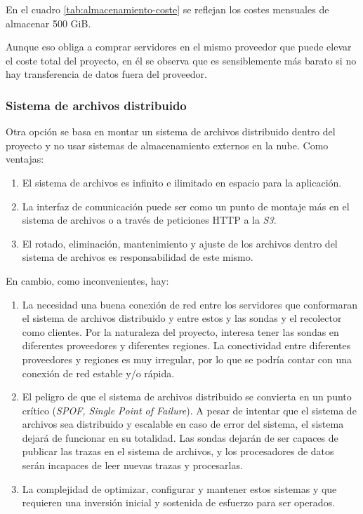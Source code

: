 En el cuadro \ref{tab:almacenamiento-coste} se reflejan los costes mensuales de almacenar 500 GiB. 

Aunque eso obliga a comprar servidores en el mismo proveedor que puede elevar el coste total del proyecto, en él se observa que es sensiblemente más barato si no hay transferencia de datos fuera del proveedor.

\subsubsection{Sistema de archivos distribuido}

Otra opción se basa en montar un sistema de archivos distribuido dentro del proyecto y no usar sistemas de almacenamiento externos
en la nube. Como ventajas:

\begin{enumerate}
    \item El sistema de archivos es infinito e ilimitado en espacio para la aplicación.
    \item La interfaz de comunicación puede ser como un punto de montaje más en el sistema de archivos o a través de 
    peticiones HTTP a la \emph{S3}.
    \item El rotado, eliminación, mantenimiento y ajuste de los archivos dentro del sistema de archivos es responsabilidad de este mismo.
\end{enumerate}

En cambio, como inconvenientes, hay:


\begin{enumerate}
    \item La necesidad una buena conexión de red entre los servidores que conformaran el sistema de archivos distribuido y entre estos y las sondas y el recolector como clientes. 
    Por la naturaleza del proyecto, interesa tener las sondas en diferentes proveedores y diferentes regiones. La conectividad entre diferentes proveedores y regiones es muy irregular, por lo que se podría contar con una conexión de red estable y/o rápida.
    \item El peligro de que el sistema de archivos distribuido se convierta en un punto crítico (\emph{SPOF, Single Point of Failure}). A pesar de intentar que el sistema de archivos sea distribuido y escalable en caso de error del sistema, el sistema dejará de funcionar en su totalidad.
    Las sondas dejarán de ser capaces de publicar las trazas en el sistema de archivos, y los procesadores de datos serán incapaces de leer nuevas trazas y procesarlas.
    \item La complejidad de optimizar, configurar y mantener estos sistemas y que requieren una inversión inicial y sostenida de esfuerzo para ser operados.
\end{enumerate}

